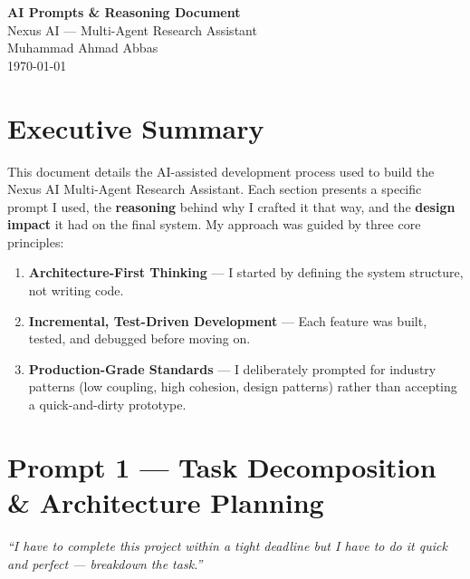 \documentclass[12pt, a4paper]{article}
\begin{document}
\begin{center}
    {\LARGE\bfseries AI Prompts \& Reasoning Document}\\[6pt]
    {\large Nexus AI — Multi-Agent Research Assistant}\\[4pt]
    {\normalsize Muhammad Ahmad Abbas}\\[2pt]
    {\small \today}
\end{center}

\vspace{10pt}

\section*{Executive Summary}

This document details the AI-assisted development process used to build the Nexus AI Multi-Agent Research Assistant. Each section presents a specific prompt I used, the \textbf{reasoning} behind why I crafted it that way, and the \textbf{design impact} it had on the final system. My approach was guided by three core principles:

\begin{enumerate}[leftmargin=2em]
    \item \textbf{Architecture-First Thinking} — I started by defining the system structure, not writing code.
    \item \textbf{Incremental, Test-Driven Development} — Each feature was built, tested, and debugged before moving on.
    \item \textbf{Production-Grade Standards} — I deliberately prompted for industry patterns (low coupling, high cohesion, design patterns) rather than accepting a quick-and-dirty prototype.
\end{enumerate}

\newpage

\section{Prompt 1 — Task Decomposition \& Architecture Planning}

\begin{promptbox}
\textit{``I have to complete this project within a tight deadline but I have to do it quick and perfect — breakdown the task.''}
\end{promptbox}
\end{document}
